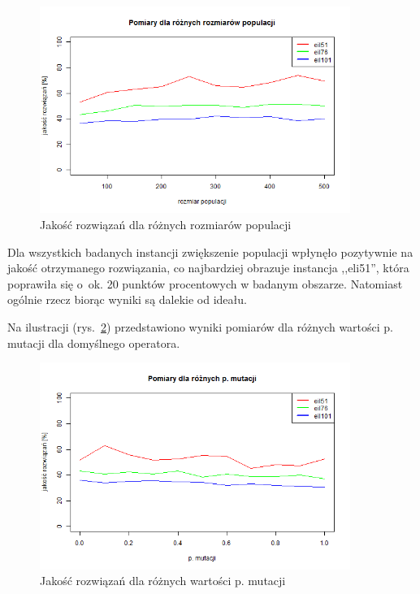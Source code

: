 \documentclass[11pt, a4paper]{article}
\newcommand{\fbi}{\leavevmode{\parindent=1em\indent}}
\begin{document}
\begin{figure}[H]
	\centering
	\includegraphics[width=0.9\textwidth]{./assets/tsp_pop.png}
	\caption{Jakość rozwiązań dla różnych rozmiarów populacji}
	\label{fig:tsppop}
\end{figure}

\fbi
Dla wszystkich badanych instancji zwiększenie populacji wpłynęło pozytywnie na jakość otrzymanego rozwiązania, co najbardziej obrazuje instancja ,,eli51'', która poprawiła się o~ok. 20 punktów procentowych w badanym obszarze. Natomiast ogólnie rzecz biorąc wyniki są dalekie od ideału.

\fbi
Na ilustracji (rys.~\ref{fig:tspmut}) przedstawiono wyniki pomiarów dla różnych wartości p. mutacji dla domyślnego operatora.

\begin{figure}[H]
	\centering
	\includegraphics[width=0.9\textwidth]{./assets/tsp_mut.png}
	\caption{Jakość rozwiązań dla różnych wartości p. mutacji}
	\label{fig:tspmut}
\end{figure}
\end{document}
